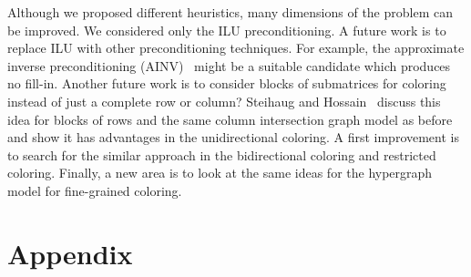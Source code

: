 \documentclass[12pt, twoside,a4paper,toc=bibliography]{scrbook}
\begin{document}
Although we proposed different heuristics, many dimensions of the problem can be improved.
We considered only the ILU preconditioning. A future work is to replace ILU
with other preconditioning techniques.
For example, the approximate inverse preconditioning (AINV)~\cite{ainv98} might be a
suitable candidate which produces no fill-in.
Another future work is to consider blocks of submatrices for coloring instead of just a complete row or column? Steihaug and Hossain~\cite{Steihaug1997GCa} discuss this idea for blocks of rows and the same column intersection graph model as before and show it has advantages in the unidirectional coloring. A first improvement is to search for the similar approach in the bidirectional coloring and restricted coloring. Finally, a new area is to look at the same ideas for the hypergraph model for fine-grained coloring.



\chapter*{Appendix}
\label{appendix}
\setcounter{chapter}{1}
\renewcommand\thechapter{\Alph{chapter}}
\end{document}
